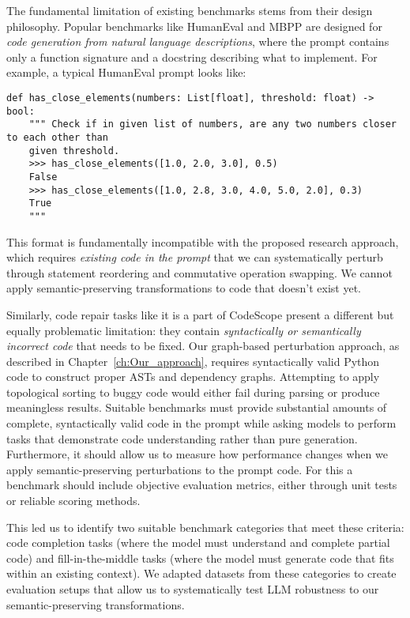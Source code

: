 \documentclass[%
thesis=student,%
coverpage=false,%
titlepage=false,%
headmarks=true, %
english,%
font=libertine, %
math=newpxtx, %
BCOR=5mm,%
coverBCOR=11mm%
]{tum-templates/book/tumbook}
\begin{document}
The fundamental limitation of existing benchmarks stems from their design philosophy. Popular benchmarks like HumanEval \cite{Chen2021} and MBPP \cite{Austin2021} are designed for \textit{code generation from natural language descriptions}, where the prompt contains only a function signature and a docstring describing what to implement. For example, a typical HumanEval prompt looks like:

\begin{lstlisting}[style=pythonstyle, caption={An example of a HumanEval prompt}]
def has_close_elements(numbers: List[float], threshold: float) -> bool:
    """ Check if in given list of numbers, are any two numbers closer to each other than
    given threshold.
    >>> has_close_elements([1.0, 2.0, 3.0], 0.5)
    False
    >>> has_close_elements([1.0, 2.8, 3.0, 4.0, 5.0, 2.0], 0.3)
    True
    """
\end{lstlisting}
This format is fundamentally incompatible with the proposed research approach, which requires \textit{existing code in the prompt} that we can systematically perturb through statement reordering and commutative operation swapping. We cannot apply semantic-preserving transformations to code that doesn't exist yet.

Similarly, code repair tasks like it is a part of CodeScope \cite{Yan2023}  present a different but equally problematic limitation: they contain \textit{syntactically or semantically incorrect code} that needs to be fixed. Our graph-based perturbation approach, as described in Chapter~\ref{ch:Our_approach}, requires syntactically valid Python code to construct proper ASTs and dependency graphs. Attempting to apply topological sorting to buggy code would either fail during parsing or produce meaningless results.
Suitable benchmarks must provide substantial amounts of complete, syntactically valid code in the prompt while asking models to perform tasks that demonstrate code understanding rather than pure generation. Furthermore, it should allow us to measure how performance changes when we apply semantic-preserving perturbations to the prompt code. For this a benchmark should include objective evaluation metrics, either through unit tests or reliable scoring methods.


This led us to identify two suitable benchmark categories that meet these criteria: code completion tasks (where the model must understand and complete partial code) and fill-in-the-middle tasks (where the model must generate code that fits within an existing context). We adapted datasets from these categories to create evaluation setups that allow us to systematically test LLM robustness to our semantic-preserving transformations.
\end{document}
